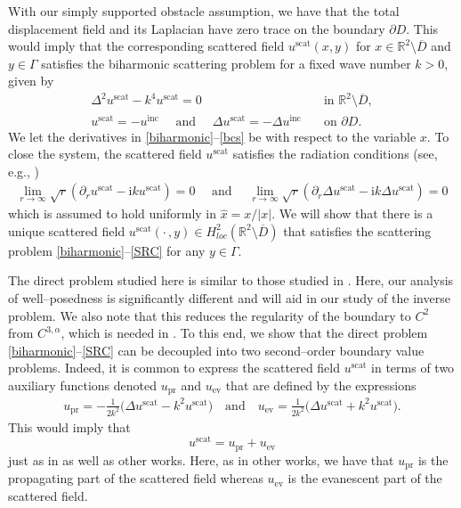 \documentclass{article}
\newcommand{\pdr}{\partial_r}
\newcommand{\exD}{\mathbb{R}^2 \setminus \overline{D}}
\numberwithin{equation}{section}
\begin{document}
With our simply supported obstacle assumption, we have that the total displacement field and its Laplacian have zero trace on the boundary $\partial D$. This would imply that the corresponding scattered field $u^{\text{scat}}(x,y)$ for $x \in \exD$ and $y \in \Gamma$ satisfies the biharmonic scattering problem for a fixed wave number $k>0$, given by 
\begin{align}
\Delta^2 u^{\text{scat}} - k^4 u^{\text{scat}} = 0  \quad\quad\quad\quad& \text{in } \mathbb{R}^2\setminus \overline{D}, \label{biharmonic} \\
u^{\text{scat}} =-u^{\text{inc}}  \quad \text{ and } \quad \Delta{u^{\text{scat}}} =- \Delta{u^{\text{inc}}} \quad & \text{on $\partial D$}. \label{bcs}
\end{align}
We let the derivatives in \eqref{biharmonic}--\eqref{bcs} be with respect to the variable $x$. To close the system, the scattered field $u^{\text{scat}}$ satisfies the radiation conditions (see, e.g., \cite{iterative-BH23,invsource-biharm})
\begin{align}\label{SRC}
\lim_{r \to \infty} \sqrt{r}(\pdr{u^{\text{scat}}} - \text{i} k u^{\text{scat}}) = 0 \quad \text{ and } \quad \lim_{r \to \infty} \sqrt{r}(\pdr{ \Delta u^{\text{scat}}} - \text{i} k \Delta u^{\text{scat}}) = 0  %
\end{align}
which is assumed to hold uniformly in $\hat{x}=x/|x|$. We will show that there is a unique scattered field $u^{\text{scat}}( \cdot  \, ,y) \in H^2_{loc}(\exD)$ that satisfies the scattering problem \eqref{biharmonic}--\eqref{SRC} for any $y \in \Gamma$. 

The direct problem studied here is similar to those studied in \cite{biwellposed,clamped-wellposed}. Here, our analysis of well--posedness is significantly different and will aid in our study of the inverse problem. We also note that this reduces the regularity of the boundary to $C^2$ from $C^{3,\alpha}$, which is needed in \cite{clamped-wellposed}. To this end, we show that the direct problem \eqref{biharmonic}--\eqref{SRC} can be decoupled into two second--order boundary value problems. Indeed, it is common to express the scattered field $u^{\text{scat}}$ in terms of two auxiliary functions denoted $u_\textrm{pr}$ and $u_\textrm{ev}$ that are defined by the expressions 
\begin{align}\label{vhvm}
u_\textrm{pr} = -\frac{1}{2k^2}\big(\Delta u^{\text{scat}} - k^2 u^{\text{scat}}\big) \quad \text{and} \quad  u_\textrm{ev} = \frac{1}{2k^2}\big(\Delta u^{\text{scat}} + k^2 u^{\text{scat}}\big).
\end{align}
This would imply that 
$$u^{\text{scat}} = u_\textrm{pr} + u_\textrm{ev}$$
just as in \cite{DSM-BH24} as well as other works. Here, as in other works, we have that $u_\textrm{pr}$ is the propagating part of the scattered field whereas $u_\textrm{ev}$ is the evanescent part of the scattered field. 
\end{document}
